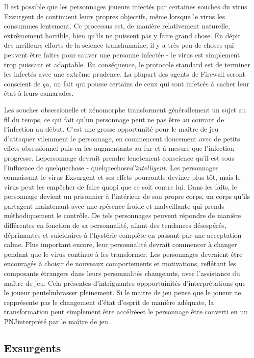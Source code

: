 Il est possible que les personnages joueurs infectés par certaines souches du virus Exsurgent de continuent leurs propres objectifs, même lorsque le virus les consummes lentement. Ce processus est, de manière relativement naturelle, extrêmement horrible, bien qu'ils ne puissent pas y faire grand chose. En dépit des meilleurs efforts de la science transhumaine, il y a très peu de choses qui peuvent être faites pour sauver une personne infectée - le virus est simplement trop puissant et adaptable. En conséquence, le protocole standard est de terminer les infectés avec une extrême prudence. La plupart des agents de Firewall seront conscient de ça, un fait qui pousse certains de ceux qui sont infetcés à cacher leur état à leurs camarades. 

Les souches obsessionelle et xénomorphe transforment générallement un sujet au fil du temps, ce qui fait qu'un personnage peut ne pas être au courant de l'infection au début. C'est une grosse opportunité pour le maître de jeu d'attaquer vilemment le personnage, en commencent doucement avec de petits effets obsessionnel puis en les augmentants au fur et à mesure que l'infection progresse. Lepersonnage devrait prendre lenetement conscience qu'il est sous l'influence de quelquechose - quelquechose\textit{d'intelligent.} Les personnages connaissant le virus Exsurgent et ses effets pourrontle deviner plus tôt, mais le virus peut les empêcher de faire quopi que ce soit contre lui. Dans les faits, le personnage devient un prisonnier à l'intérieur de son propre corps, un corps qu'ils partagent maintenant avec une rpésence froide et malveillante qui prends méthodiquement le contrôle. De tels personnages peuvent répondre de manière différentes en fonction de sa personnalité, allant des tendances désespérés, déprimantes et suicidaires à l'hystérie complète en passant par une acceptation calme. Plus important encore, leur personnalité devrait commencer à changer pendant que le virus continue à les transformer. Les personnages devraient être encouragés à choisir de nouveaux comportements et motivations, reflétant les composants étrangers dans leurs personnalités changeants, avec l'assistance du maître de jeu. Cela présentes d'intriguantes oppportuinités d'interprétations que le joueur peutelmbrasser pleinement. Si le maitre de jeu pense que le joueur ne repprésente pas le changement d'état d'esprit de manière adéquate, la transformation peut simplement être accélréeet le personnage être converti en un PNJinterprété par le maître de jeu. 

\subsection{Exsurgents } 

